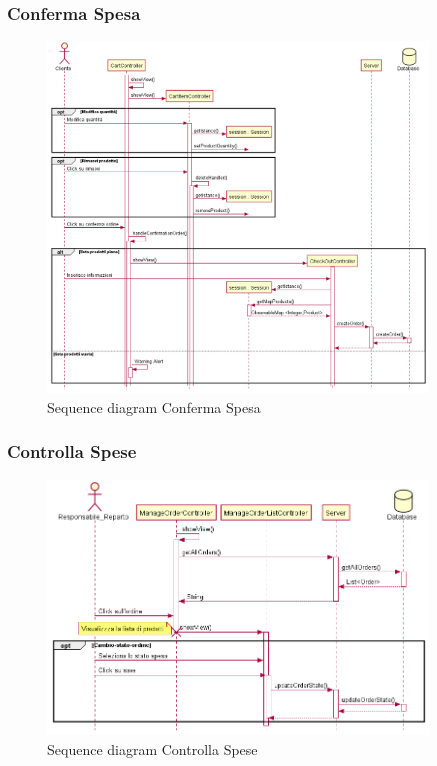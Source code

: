 \documentclass[12pt, a4paper]{report}
\begin{document}
\newpage

\subsubsection{Conferma Spesa}

\begin{figure}[ht]
  \centering
  \includegraphics[width=0.9\textwidth]{sequence_conferma_spesa.png}
  \caption{Sequence diagram Conferma Spesa}
\end{figure}

\newpage

\subsubsection{Controlla Spese}

\begin{figure}[ht]
  \centering
  \includegraphics[width=0.9\textwidth]{sequence_controllo_spese.png}
  \caption{Sequence diagram Controlla Spese}
\end{figure}
\end{document}
